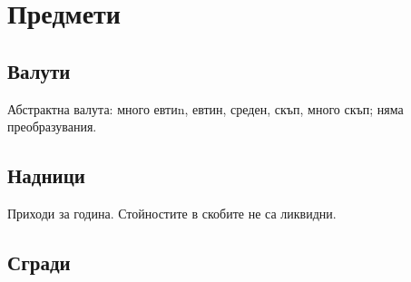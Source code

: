 \section{Предмети}
\subsection{Валути}
Абстрактна валута: много евтиn, евтин, среден, скъп, много скъп; няма преобразувания.  \\

\subsection{Надници}
Приходи за година. Стойностите в скобите не са ликвидни.

\subsection{Сгради}

